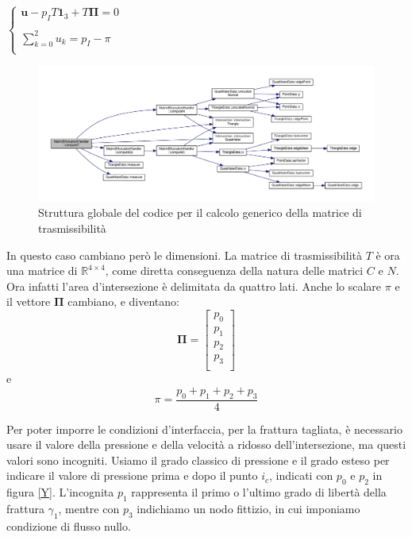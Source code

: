 \begin{center}			
	$\left \{
		\begin{array}{l}	
	 		\textbf{u} - p_{I}T\textbf{1}_{3}+T \boldsymbol{\Pi}=0  \\ \\
     	 	\displaystyle \sum_{k=0}^2 u_{k} = p_{I} - \pi  \\
		\end{array}
	\right.$
\end{center} \label{condizioni d'interfaccia y }

\begin{figure}[htbp]
\begin{center}
\includegraphics[width=1\textwidth]{img/cap6/dipendenze.pdf}
\caption{Struttura globale del codice per il calcolo generico della matrice di trasmissibilità}\label{dipendenze}
\end{center}
\end{figure}


\noindent In questo caso cambiano però le dimensioni. La matrice di trasmissibilità $T$ è ora una matrice di $\mathbb{R}^{4 \times 4}$, come diretta conseguenza della natura delle matrici $C$ e $N$. Ora infatti l'area d'intersezione è delimitata da quattro lati. Anche lo scalare $\pi$ e il vettore $\boldsymbol{\Pi}$ cambiano, e diventano:
$$\boldsymbol{\Pi} = \left[ \begin{matrix}
 			p_0\\ 
 			p_1\\
 			p_2 \\ 
		 	p_3 \\
 			\end{matrix}\right] 
$$ 
 e
$$ \pi = \frac{p_0 + p_1 + p_2 + p_3 }{4} $$

Per poter imporre le condizioni d'interfaccia, per la frattura tagliata, è necessario usare il valore della pressione e della velocità a ridosso dell'intersezione, ma questi valori sono incogniti. 
Usiamo il grado classico di pressione e il grado esteso per indicare il valore di pressione prima e dopo il punto $i_c$, indicati con $p_0$ e $p_2$ in figura \ref{Y}.  L'incognita $p_1$ rappresenta il primo o l'ultimo grado di libertà della frattura $\gamma_1$, mentre con $p_3$ indichiamo un nodo fittizio, in cui imponiamo condizione di flusso nullo. 

